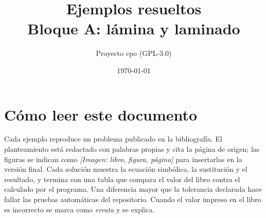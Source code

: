 \documentclass[11pt]{article}
\title{Ejemplos resueltos\\ Bloque A: lámina y laminado}
\author{Proyecto cpo (GPL-3.0)}
\date{\today}
\begin{document}
\maketitle
\section*{Cómo leer este documento}
Cada ejemplo reproduce un problema publicado en la bibliografía. El planteamiento está redactado con palabras propias y cita la página de origen; las figuras se indican como \textit{[Imagen: libro, figura, página]} para insertarlas en la versión final. Cada solución muestra la ecuación simbólica, la sustitución y el resultado, y termina con una tabla que compara el valor del libro contra el calculado por el programa. Una diferencia mayor que la tolerancia declarada hace fallar las pruebas automáticas del repositorio. Cuando el valor impreso en el libro es incorrecto se marca como \textit{errata} y se explica.
\end{document}
